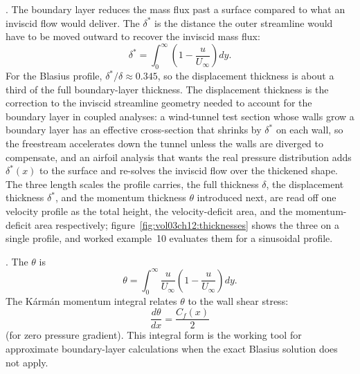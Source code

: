 . The boundary layer reduces the
mass flux past a surface compared to what an inviscid flow would
deliver. The  $\delta^*$ is the
distance the outer streamline would have to be moved outward to
recover the inviscid mass flux:
\[
\delta^* = \int_0^\infty \left(1 - \frac{u}{U_\infty}\right) dy.
\]
For the Blasius profile, $\delta^*/\delta \approx 0.345$, so the
displacement thickness is about a third of the full
boundary-layer thickness. The displacement thickness is the
correction to the inviscid streamline geometry needed to account
for the boundary layer in coupled analyses: a wind-tunnel test
section whose walls grow a boundary layer has an effective
cross-section that shrinks by $\delta^*$ on each wall, so the
freestream accelerates down the tunnel unless the walls are
diverged to compensate, and an airfoil analysis that wants the
real pressure distribution adds $\delta^*(x)$ to the surface and
re-solves the inviscid flow over the thickened shape. The three
length scales the profile carries, the full thickness $\delta$, the
displacement thickness $\delta^*$, and the momentum thickness
$\theta$ introduced next, are read off one velocity profile as the
total height, the velocity-deficit area, and the momentum-deficit
area respectively; figure~\ref{fig:vol03ch12:thicknesses} shows the
three on a single profile, and worked example~10 evaluates them for
a sinusoidal profile.

. The 
$\theta$ is
\[
\theta = \int_0^\infty \frac{u}{U_\infty}\left(1 - \frac{u}{U_
\infty}\right) dy.
\]
The Kármán momentum integral relates $\theta$ to the wall shear
stress:
\[
\frac{d\theta}{dx} = \frac{C_f(x)}{2}
\]
(for zero pressure gradient). This integral form is the
working tool for approximate boundary-layer calculations when the
exact Blasius solution does not apply.

